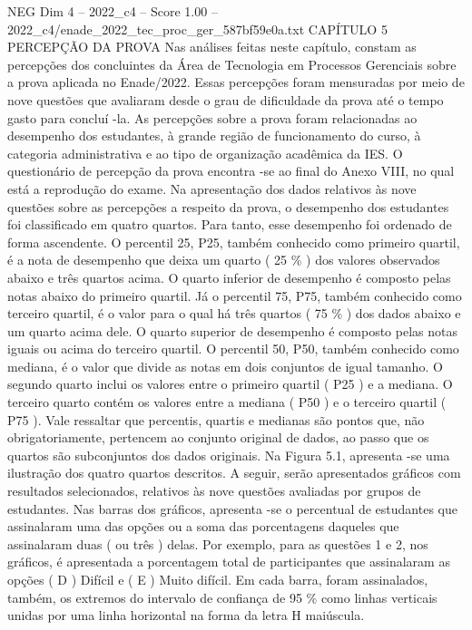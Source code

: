 \begin{textsample}{NEG Dim 4 – 2022\_c4 – Score 1.00 – 2022\_c4/enade\_2022\_tec\_proc\_ger\_587bf59e0a.txt}  \label{ex:f4_neg_215}
CAPÍTULO 5 PERCEPÇÃO DA PROVA Nas análises feitas neste capítulo, constam as percepções dos concluintes da Área de Tecnologia em Processos Gerenciais sobre a prova aplicada no Enade/2022.
Essas percepções foram mensuradas por meio de nove questões que avaliaram desde o grau de dificuldade da prova até o tempo gasto para concluí -la.
As percepções sobre a prova foram relacionadas ao desempenho dos estudantes, à grande região de funcionamento do curso, à categoria administrativa e ao tipo de organização acadêmica da IES.
O questionário de percepção da prova encontra -se ao final do Anexo VIII, no qual está a reprodução do exame.
Na apresentação dos dados relativos às nove questões sobre as percepções a respeito da prova, o desempenho dos estudantes foi classificado em quatro quartos.
Para tanto, esse desempenho foi ordenado de forma ascendente.
O percentil 25, P25, também conhecido como primeiro quartil, é a nota de desempenho que deixa um quarto ( 25 \% ) dos valores observados abaixo e três quartos acima.
O quarto inferior de desempenho é composto pelas notas abaixo do primeiro quartil.
Já o percentil 75, P75, também conhecido como terceiro quartil, é o valor para o qual há três quartos ( 75 \% ) dos dados abaixo e um quarto acima dele.
O quarto superior de desempenho é composto pelas notas iguais ou acima do terceiro quartil.
O percentil 50, P50, também conhecido como mediana, é o valor que divide as notas em dois conjuntos de igual tamanho.
O segundo quarto inclui os valores entre o primeiro quartil ( P25 ) e a mediana.
O terceiro quarto contém os valores entre a mediana ( P50 ) e o terceiro quartil ( P75 ).
Vale ressaltar que percentis, quartis e medianas são pontos que, não obrigatoriamente, pertencem ao conjunto original de dados, ao passo que os quartos são subconjuntos dos dados originais.
Na Figura 5.1, apresenta -se uma ilustração dos quatro quartos descritos.
A seguir, serão apresentados gráficos com resultados selecionados, relativos às nove questões avaliadas por grupos de estudantes.
Nas barras dos gráficos, apresenta -se o percentual de estudantes que assinalaram uma das opções ou a soma das porcentagens daqueles que assinalaram duas ( ou três ) delas.
Por exemplo, para as questões 1 e 2, nos gráficos, é apresentada a porcentagem total de participantes que assinalaram as opções ( D ) Difícil e ( E ) Muito difícil.
Em cada barra, foram assinalados, também, os extremos do intervalo de confiança de 95 \% como linhas verticais unidas por uma linha horizontal na forma da letra H maiúscula.

\end{textsample}
